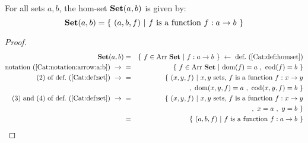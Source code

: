 \begin{prop}\label{Cat:prop:homset:set}
    For all sets $a,b$, the hom-set $\mbox{\bf Set}(a,b)$ is given by:
        \[
            \Set(a,b)=\{\ (a,b,f)\ |\ 
            \mbox{$f$ is a function $f:a\to b$}\ \}
        \]
\end{prop}
\begin{proof}
    \begin{eqnarray*}\Set(a,b)
        &=&\{\ f\in\arr\ \Set\ |\ f : a \to b\ \}
        \ \leftarrow\ \mbox{def.~(\ref{Cat:def:homset})}\\
        \mbox{notation~(\ref{Cat:notation:arrow:a:b})}\ \to\ 
        &=&\{\ f\in\arr\ \Set\ |\ \dom(f)=a\ ,\ \cod(f)=b\  \}\\
        \mbox{$(2)$ of def.~(\ref{Cat:def:set})}\ \to\ 
        &=&\{\ (x,y,f)\ |\ x,y\ \mbox{sets, $f$ is a function 
        $f:x\to y$}\\
        &\ &,\ \dom(x,y,f)=a\ ,\ \cod(x,y,f)=b\ \}\\
        \mbox{$(3)$ and $(4)$ of def.~(\ref{Cat:def:set})}\ \to\ 
        &=&\{\ (x,y,f)\ |\ x,y\ \mbox{sets, $f$ is a function 
        $f:x\to y$}\\
        &\ &,\ x=a\ ,\ y=b\ \}\\
        &=&\{\ (a,b,f)\ |\ \mbox{$f$ is a function $f:a\to b$}\ \}
    \end{eqnarray*}
\end{proof}

